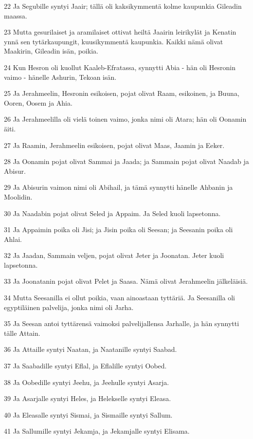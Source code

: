 \par 22 Ja Segubille syntyi Jaair; tällä oli kaksikymmentä kolme kaupunkia Gileadin maassa.
\par 23 Mutta gesurilaiset ja aramilaiset ottivat heiltä Jaairin leirikylät ja Kenatin ynnä sen tytärkaupungit, kuusikymmentä kaupunkia. Kaikki nämä olivat Maakirin, Gileadin isän, poikia.
\par 24 Kun Hesron oli kuollut Kaaleb-Efratassa, synnytti Abia - hän oli Hesronin vaimo - hänelle Ashurin, Tekoan isän.
\par 25 Ja Jerahmeelin, Hesronin esikoisen, pojat olivat Raam, esikoinen, ja Buuna, Ooren, Oosem ja Ahia.
\par 26 Ja Jerahmeelilla oli vielä toinen vaimo, jonka nimi oli Atara; hän oli Oonamin äiti.
\par 27 Ja Raamin, Jerahmeelin esikoisen, pojat olivat Maas, Jaamin ja Eeker.
\par 28 Ja Oonamin pojat olivat Sammai ja Jaada; ja Sammain pojat olivat Naadab ja Abisur.
\par 29 Ja Abisurin vaimon nimi oli Abihail, ja tämä synnytti hänelle Ahbanin ja Moolidin.
\par 30 Ja Naadabin pojat olivat Seled ja Appaim. Ja Seled kuoli lapsetonna.
\par 31 Ja Appaimin poika oli Jisi; ja Jisin poika oli Seesan; ja Seesanin poika oli Ahlai.
\par 32 Ja Jaadan, Sammain veljen, pojat olivat Jeter ja Joonatan. Jeter kuoli lapsetonna.
\par 33 Ja Joonatanin pojat olivat Pelet ja Saasa. Nämä olivat Jerahmeelin jälkeläisiä.
\par 34 Mutta Seesanilla ei ollut poikia, vaan ainoastaan tyttäriä. Ja Seesanilla oli egyptiläinen palvelija, jonka nimi oli Jarha.
\par 35 Ja Seesan antoi tyttärensä vaimoksi palvelijallensa Jarhalle, ja hän synnytti tälle Attain.
\par 36 Ja Attaille syntyi Naatan, ja Naatanille syntyi Saabad.
\par 37 Ja Saabadille syntyi Eflal, ja Eflalille syntyi Oobed.
\par 38 Ja Oobedille syntyi Jeehu, ja Jeehulle syntyi Asarja.
\par 39 Ja Asarjalle syntyi Heles, ja Helekselle syntyi Eleasa.
\par 40 Ja Eleasalle syntyi Sismai, ja Sismaille syntyi Sallum.
\par 41 Ja Sallumille syntyi Jekamja, ja Jekamjalle syntyi Elisama.
